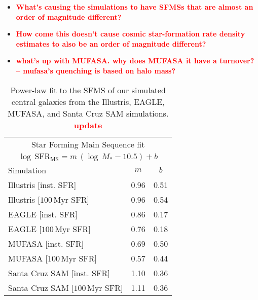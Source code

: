\documentclass[preprint2,tighten]{aastex62}
\newcommand{\todo}[1]{{\bf \textcolor{red}{ #1}}}
\begin{document}
\begin{itemize}
\item \todo{What's causing the simulations to have SFMSs that are almost an 
order of magnitude different?} 
\item \todo{How come this doesn't cause cosmic star-formation rate 
density estimates to also be an order of magnitude different?}
\item \todo{what's up with MUFASA. why does MUFASA it have a turnover? -- 
mufasa's quenching is based on halo mass?}
\end{itemize}
\begin{table}
\caption{Power-law fit to the SFMS of our simulated central galaxies from the
Illustris, EAGLE, MUFASA, and Santa Cruz SAM simulations.\todo{update}} 
\begin{center}
\begin{tabular}{p{5cm}cc} \toprule
\multicolumn{3}{c}{Star Forming Main Sequence fit} \\
\multicolumn{3}{c}{$\log\,\mathrm{SFR}_\mathrm{MS} = m\,(\log\,M_* - 10.5) + b$  } \\ [5pt]
Simulation & $m$ & $b$ \\ 
\hline
Illustris [inst. SFR] & 0.96 & 0.51 \\ 
Illustris [$100\,\mathrm{Myr}$ SFR] & 0.96 & 0.54 \\ [2pt]
EAGLE [inst. SFR] & 0.86 & 0.17 \\ 
EAGLE [$100\,\mathrm{Myr}$ SFR] & 0.76 & 0.18 \\ [2pt]
MUFASA [inst. SFR] & 0.69 & 0.50 \\ 
MUFASA [$100\,\mathrm{Myr}$ SFR] & 0.57 & 0.44 \\ [2pt]
Santa Cruz SAM [inst. SFR] & 1.10 & 0.36 \\ 
Santa Cruz SAM [$100\,\mathrm{Myr}$ SFR] & 1.11 & 0.36 \\ 
\hline
\end{tabular} \label{tab:sfms_powerlaw}
\end{center}
\end{table}
\end{document}
